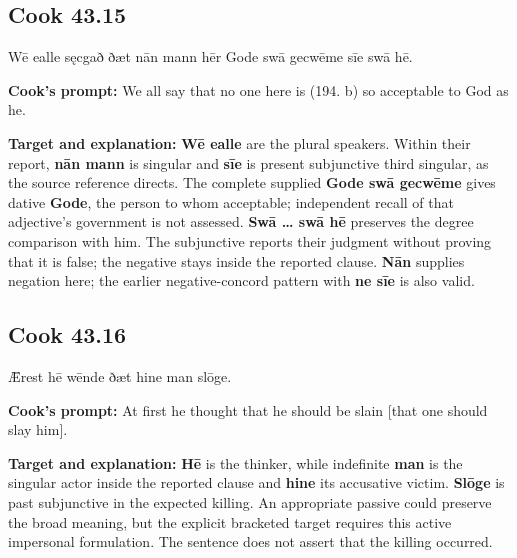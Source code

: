 \par\begin{minipage}{\linewidth}\raggedright
\subsection*{Cook 43.15}

Wē ealle sęcgað ðæt nān mann hēr Gode swā gecwēme sīe swā hē.

\textbf{Cook's prompt:} We all say that no one here is (194. b) so acceptable to God as he.

\textbf{Target and explanation:} \textbf{Wē ealle} are the plural speakers. Within their report, \textbf{nān mann} is singular and \textbf{sīe} is present subjunctive third singular, as the source reference directs. The complete supplied \textbf{Gode swā gecwēme} gives dative \textbf{Gode}, the person to whom acceptable; independent recall of that adjective's government is not assessed. \textbf{Swā … swā hē} preserves the degree comparison with him. The subjunctive reports their judgment without proving that it is false; the negative stays inside the reported clause. \textbf{Nān} supplies negation here; the earlier negative-concord pattern with \textbf{ne sīe} is also valid.

\end{minipage}\par\addvspace{4pt}

\par\begin{minipage}{\linewidth}\raggedright
\subsection*{Cook 43.16}

Ǣrest hē wēnde ðæt hine man slōge.

\textbf{Cook's prompt:} At first he thought that he should be slain [that one should slay him].

\textbf{Target and explanation:} \textbf{Hē} is the thinker, while indefinite \textbf{man} is the singular actor inside the reported clause and \textbf{hine} its accusative victim. \textbf{Slōge} is past subjunctive in the expected killing. An appropriate passive could preserve the broad meaning, but the explicit bracketed target requires this active impersonal formulation. The sentence does not assert that the killing occurred.

\end{minipage}\par\addvspace{4pt}

